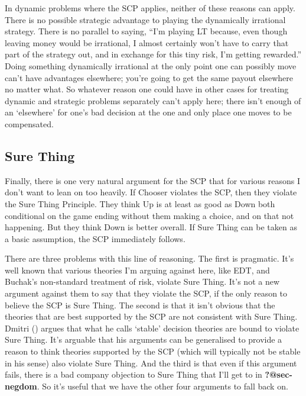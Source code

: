 \documentclass[
  10pt,
  letterpaper,
  DIV=11,
  numbers=noendperiod,
  twoside]{scrartcl}
\begin{document}
In dynamic problems where the SCP applies, neither of these reasons can
apply. There is no possible strategic advantage to playing the
dynamically irrational strategy. There is no parallel to saying, ``I'm
playing LT because, even though leaving money would be irrational, I
almost certainly won't have to carry that part of the strategy out, and
in exchange for this tiny risk, I'm getting rewarded.'' Doing something
dynamically irrational at the only point one can possibly move can't
have advantages elsewhere; you're going to get the same payout elsewhere
no matter what. So whatever reason one could have in other cases for
treating dynamic and strategic problems separately can't apply here;
there isn't enough of an `elsewhere' for one's bad decision at the one
and only place one moves to be compensated.

\subsection{Sure Thing}\label{sec-surething}

Finally, there is one very natural argument for the SCP that for various
reasons I don't want to lean on too heavily. If Chooser violates the
SCP, then they violate the Sure Thing Principle. They think Up is at
least as good as Down both conditional on the game ending without them
making a choice, and on that not happening. But they think Down is
better overall. If Sure Thing can be taken as a basic assumption, the
SCP immediately follows.

There are three problems with this line of reasoning. The first is
pragmatic. It's well known that various theories I'm arguing against
here, like EDT, and Buchak's non-standard treatment of risk, violate
Sure Thing. It's not a new argument against them to say that they
violate the SCP, if the only reason to believe the SCP is Sure Thing.
The second is that it isn't obvious that the theories that are best
supported by the SCP are not consistent with Sure Thing. Dmitri
() argues that what he
calls `stable' decision theories are bound to violate Sure Thing. It's
arguable that his arguments can be generalised to provide a reason to
think theories supported by the SCP (which will typically not be stable
in his sense) also violate Sure Thing. And the third is that even if
this argument fails, there is a bad company objection to Sure Thing that
I'll get to in \textbf{?@sec-negdom}. So it's useful that we have the
other four arguments to fall back on.
\end{document}
